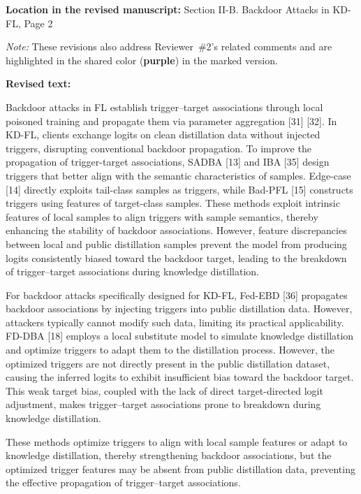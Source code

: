 \documentclass[11pt,a4paper]{article}
\newcommand{\manualindent}{\par\noindent\hspace*{1.5em}\ignorespaces}
\newcommand{\revisedtext}[2]{%
  {\bfseries\color{headingnavy}Location in the revised manuscript:} #1\par
  \begin{tcolorbox}[
      enhanced,breakable,colback=replyblue!3,colframe=replyblue!18,
      before upper={\setlength{\parskip}{6pt}},
      borderline west={2.5pt}{0pt}{replyblue},
      boxrule=0.5pt,arc=1mm,left=11pt,right=9pt,top=8pt,bottom=8pt]
    {\bfseries\color{headingnavy}Revised text:}\par
    #2
  \end{tcolorbox}
  \vspace{0.35em}%
}
\begin{document}
\revisedtext{Section II-B. Backdoor Attacks in KD-FL, Page 2 \par \noindent \textit{Note:} These revisions also address Reviewer~\#2's related comments and are highlighted in the shared color (\textcolor{share}{\textbf{purple}}) in the marked version.}{\manualindent Backdoor attacks in FL establish trigger--target associations through local poisoned training and propagate them via parameter aggregation [31] [32].
In KD-FL, clients exchange logits on clean distillation data without injected triggers, disrupting conventional backdoor propagation.
To improve the propagation of trigger-target associations, SADBA [13] and IBA [35] design triggers that better align with the semantic characteristics of samples.
Edge-case [14] directly exploits tail-class samples as triggers, while Bad-PFL [15] constructs triggers using features of target-class samples.
These methods exploit intrinsic features of local samples to align triggers with sample semantics, thereby enhancing the stability of backdoor associations.
However, feature discrepancies between local and public distillation samples prevent the model from producing logits consistently biased toward the backdoor target, leading to the breakdown of trigger--target associations during knowledge distillation.

\manualindent For backdoor attacks specifically designed for KD-FL, Fed-EBD [36] propagates backdoor associations by injecting triggers into public distillation data. However, attackers typically cannot modify such data, limiting its practical applicability.
FD-DBA [18] employs a local substitute model to simulate knowledge distillation and optimize triggers to adapt them to the distillation process.
However, the optimized triggers are not directly present in the public distillation dataset, causing the inferred logits to exhibit insufficient bias toward the backdoor target. 
This weak target bias, coupled with the lack of direct target-directed logit adjustment, makes trigger–target associations prone to breakdown during knowledge distillation.

\manualindent These methods optimize triggers to align with local sample features or adapt to knowledge distillation, thereby strengthening backdoor associations, but the optimized trigger features may be absent from public distillation data, preventing the effective propagation of trigger--target associations.}
\end{document}
